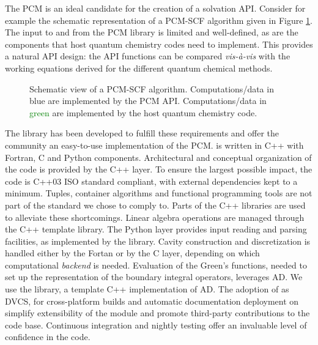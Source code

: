 The \acrshort{PCM} is an ideal candidate for the creation of a solvation
\acrshort{API}. Consider for example the schematic representation of a
\acrshort{PCM}-\acrshort{SCF} algorithm given in Figure \ref{fig:algorithm}.
The input to and from the \acrshort{PCM} library is limited and well-defined,
as are the components that host quantum chemistry codes need to
implement.
This provides a natural \acrshort{API} design: the \acrshort{API} functions can be
compared \emph{vis-à-vis} with the working equations derived for the
different quantum chemical methods.

\begin{figure}[tb]
\centering
\scalebox{0.7}{}
\caption[Modular approach to programming a \acrshort{PCM} functionality into an existing \acrshort{SCF} code.]{
Schematic view of a \acrshort{PCM}-\acrshort{SCF} algorithm. Computations/data in
\textcolor{brewerBlue}{blue} are implemented by the \acrshort{PCM} \acrshort{API}.
Computations/data in \textcolor{Green}{green} are implemented by the
host quantum chemistry code.
  }
\label{fig:algorithm}
\end{figure}

The \pcmsolver library has been developed to fulfill these requirements and
offer the community an easy-to-use implementation of the
\acrshort{PCM}.\autocite{PCMSolver}
\pcmsolver is written in C++ with Fortran, C and Python components.
Architectural and conceptual organization of the code is provided by the
C++ layer. To ensure the largest possible impact, the code is C++03 ISO standard
compliant, with external dependencies kept to a minimum.
Tuples, container algorithms and functional programming tools are not
part of the standard we chose to comply to.
Parts of the \Boost C++ libraries are used to alleviate these
shortcomings.\autocite{boost}
Linear algebra operations are managed through the \Eigen C++ template
library.\autocite{eigen}
The Python layer provides input reading and parsing facilities,
as implemented by the \GetKw library.\autocite{libgetkw}
Cavity construction and discretization is handled either by the Fortan
or by the C layer, depending on which computational \emph{backend} is
needed.
Evaluation of the Green's functions, needed to set up the representation
of the boundary integral operators, leverages \gls{AD}. We use the \Taylor library, a template C++
implementation of \acrshort{AD}.\autocite{Bartholomew-Biggs2000-db, libtaylor}
The adoption of \git as \acrshort{DVCS}, \cmake for cross-platform builds and
automatic documentation deployment on \readthedocs simplify
extensibility of the module and promote third-party contributions to the
code base. Continuous integration and nightly testing offer an
invaluable level of confidence in the code.

